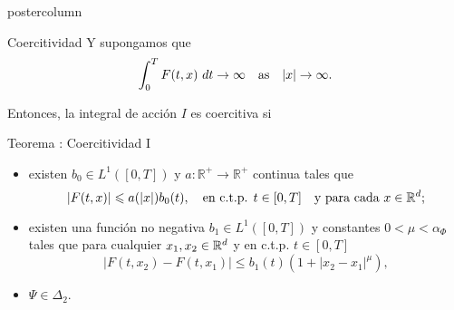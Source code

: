 \documentclass[final,hyperref={pdfpagelabels=false}]{beamer}
\begin{document}
\begin{frame}
\begin{columns}
\begin{column}{.49\textwidth}
\begin{beamercolorbox}[center,wd=\textwidth]{postercolumn}
\begin{minipage}[T]{.95\textwidth}
{\begin{block}{Coercitividad}
Y supongamos  que 
\begin{equation}\label{propiedad1coercividad}
\int_{0}^{T}F(t,x)\ dt \rightarrow \infty \quad \hbox{as} \quad |x|\rightarrow \infty.
\end{equation}

Entonces, la integral de acción $I$ es coercitiva si

\begin{minipage}[T]{.9\textwidth}
\begin{block}{Teorema \cite{ABGMS2015}: Coercitividad I}\label{coercitividad1}
\begin{itemize} 
\item existen $b_0\in L^1([0,T])$ y $a:\mathbb{R}^+\to \mathbb{R}^+$ continua tales que 
\begin{equation}\label{condA1} |F(t,x)|\leqslant a(|x|)b_0(t),\quad\text{en c.t.p. }t\in [0,T] \quad\text{y para cada } x\in\mathbb{R}^d;
\end{equation}
\item existen una función no negativa  $b_1 \in L^1([0,T])$ y constantes $0<\mu<\alpha_{\Phi}$ 
tales que para cualquier  $x_1,x_2\in\mathbb{R}^d$ y en c.t.p. $t\in [0,T]$
\begin{equation}\label{holder_cont}
  \left| F(t,x_2)- F(t,x_1) \right|\leq b_1(t)(1+|x_2-x_1|^{\mu}),
\end{equation}
\item\label{hipot_coer}  $\Psi\in\Delta_2$.
\end{itemize}
\end{block}
\end{minipage}


\end{block}}
\end{minipage}
\end{beamercolorbox}
\end{column}
\end{columns}
\end{frame}
\end{document}
